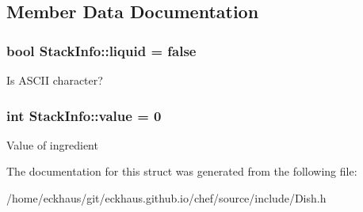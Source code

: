 \subsection{Member Data Documentation}
\hypertarget{structStackInfo_a37ea92877d69ca4e88f5820d4eab787b}{
\subsubsection[{liquid}]{\setlength{\rightskip}{0pt plus 5cm}bool Stack\-Info\-::liquid = false}}\label{structStackInfo_a37ea92877d69ca4e88f5820d4eab787b}
Is A\-S\-C\-I\-I character? \hypertarget{structStackInfo_a14e308ce84edd0276ae34990f7891212}{
\subsubsection[{value}]{\setlength{\rightskip}{0pt plus 5cm}int Stack\-Info\-::value = 0}}\label{structStackInfo_a14e308ce84edd0276ae34990f7891212}
Value of ingredient 

The documentation for this struct was generated from the following file\-:\begin{DoxyCompactItemize}
\item 
/home/eckhaus/git/eckhaus.\-github.\-io/chef/source/include/Dish.\-h\end{DoxyCompactItemize}
